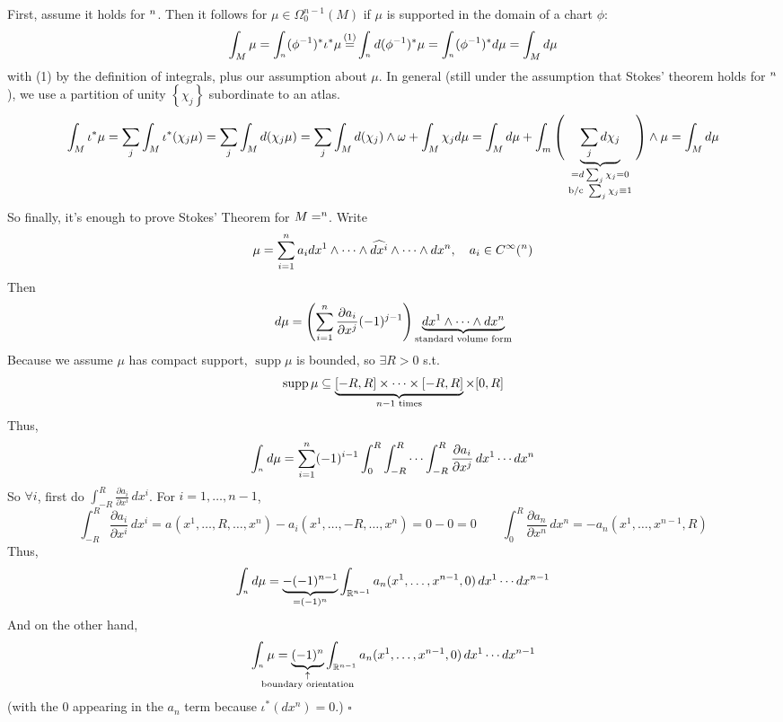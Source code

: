\documentclass[10pt,letterpaper]{article}
\newcommand{\n}{\hfill\break}
\newcommand{\proven}{\;$\square$\n}
\newcommand{\ptxt}[1]{\textrm{\textnormal{#1}}}
\newcommand{\set}[1]{\left\{#1\right\}}
\newcommand{\reals}{\mathbb{R}}
\newcommand{\R}{\reals}
\newcommand{\halfPlane}{\mathbb{H}}
\let\H\relax
\newcommand{\H}{\halfPlane}
\let\d\relax
\newcommand{\d}{\partial}
\newcommand{\inv}{^{-1}}
\DeclareMathOperator{\supp}{supp}
\newcommand{\pd}[2]{\frac{\partial{}#1}{\partial{}#2}}
\newcommand{\st}{s.t.}
\newcommand{\labeledeq}[1]{\overset{\mathclap{\ptxt{#1}}}{=}}
\newcommand{\paren}[1]{\left(#1\right)}
\begin{document}
\par\noindent
First, assume it holds for $\H^{n}$. Then it follows for $\mu\in\Omega_{0}^{n-1}(M)$ if $\mu$ is supported in the domain of a chart $\phi$:
\[
	\int_{\d{}M}\mu=\int_{\d\H^{n}}(\phi\inv)^{*}\iota^{*}\mu\labeledeq{(1)}\int_{\H^{n}}d(\phi\inv)^{*}\mu=\int_{\H^{n}}(\phi\inv)^{*}d\mu=\int_{M}d\mu
\]
with (1) by the definition of integrals, plus our assumption about $\mu$. In general (still under the assumption that Stokes' theorem holds for $\H^{n}$), we use a partition of unity $\set{\chi_{j}}$ subordinate to an atlas.
\[
	\int_{\d{}M}\iota^{*}\mu=\sum_{j}\int_{\d{}M}\iota^{*}(\chi_{j}\mu)=\sum_{j}\int_{M}d(\chi_{j}\mu)=\sum_{j}\int_{M}d(\chi_{j})\wedge\omega+\int_{M}\chi_{j}d\mu=\int_{M}d\mu+\int_{m}\left(\vphantom{\sum_{j}}\right.\underbrace{\sum_{j}d\chi_{j}}_{\substack{=d\sum_{j}\chi_{j}=0\\ \ptxt{b/c }\sum_{j}\chi_{j}\equiv{}1}}\left.\vphantom{\sum_{j}}\right)\wedge\mu=\int_{M}d\mu
\]
So finally, it's enough to prove Stokes' Theorem for $M=\H^{n}$. Write
\[
	\mu=\sum_{i=1}^{n}a_{i}dx^{1}\wedge\cdots\wedge\widehat{dx^{i}}\wedge\cdots\wedge{}dx^{n},\quad{}a_{i}\in{}C^{\infty}(\H^{n})
\]
Then
\[
	d\mu=\paren{\sum_{i=1}^{n}\pd{a_{i}}{x^{j}}(-1)^{j-1}}\underbrace{dx^{1}\wedge\cdots\wedge{}dx^{n}}_{\ptxt{standard volume form}}
\]
Because we assume $\mu$ has compact support, $\supp\mu$ is bounded, so $\exists{}R>0$ \st{}
\[
	\supp\mu\subseteq\underbrace{[-R,R]\times\cdots\times[-R,R]}_{n-1\ptxt{ times}}\times[0,R]
\]
Thus,
\[
	\int_{\H^{n}}d\mu=\sum_{i=1}^{n}(-1)^{i-1}\int_{0}^{R}\int_{-R}^{R}\cdots\int_{-R}^{R}\pd{a_{i}}{x^{j}}\,dx^{1}\cdots{}dx^{n}
\]
So $\forall{}i$, first do $\int_{-R}^{R}\pd{a_{i}}{x^{i}}\,dx^{i}$. For $i=1,\ldots,n-1$,
\[
	\int_{-R}^{R}\pd{a_{i}}{x^{i}}\,dx^{i}=a_{}(x^{1},\ldots,R,\ldots,x^{n})-a_{i}(x^{1},\ldots,-R,\ldots,x^{n})=0-0=0
	\qquad
	\int_{0}^{R}\pd{a_{n}}{x^{n}}\,dx^{n}=-a_{n}(x^{1},\ldots,x^{n-1},R)
\]
Thus,
\[
	\int_{\H^{n}}d\mu=\underbrace{-(-1)^{n-1}}_{=(-1)^{n}}\int_{\R^{n-1}}a_{n}(x^{1},\ldots,x^{n-1},0)\,dx^{1}\cdots{}dx^{n-1}
\]
And on the other hand,
\[
	\int_{\d\H^{n}}\mu=\underbrace{(-1)^{n}}_{\mathclap{\substack{\uparrow\\ \ptxt{boundary orientation}}}}\int_{\R^{n-1}}a_{n}(x^{1},\ldots,x^{n-1},0)\,dx^{1}\cdots{}dx^{n-1}
\]
(with the $0$ appearing in the $a_{n}$ term because $\iota^{*}(dx^{n})=0$.)\n
\proven
\end{document}
